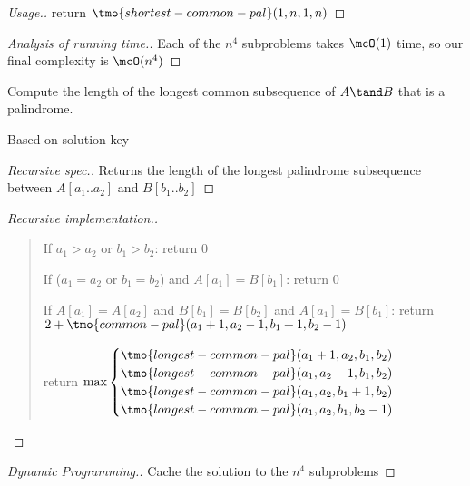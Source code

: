 \documentclass{article}
\begin{document}
\begin{proof}[Usage.]
  return $ \tmo{shortest-common-pal}(1,n,1,n) $
\end{proof}

\begin{proof}[Analysis of running time.]
  Each of the $ n^4 $ subproblems takes $ \mcO(1) $ time, so our final complexity is $ \mcO(n^4) $
\end{proof}
\pagebreak

\begin{subexercise} %
  Compute the length of the longest common subsequence of $A \tand B$ that is a
  palindrome.
\end{subexercise}

\begin{note}
  Based on solution key
\end{note}

\begin{proof}[Recursive spec.]
  Returns the length of the longest palindrome subsequence between $ A[a_1..a_2] $ and $ B[b_1..b_2] $
\end{proof}

\begin{proof}[Recursive implementation.]\
\begin{quote}
\begin{steps}
  \item If $ a_1 > a_2 $ or $ b_1 > b_2 $: return 0
  \item If ($ a_1 = a_2 $ or $ b_1 = b_2 $) and $ A[a_1] = B[b_1] $: return 0
  \item If $ A[a_1] = A[a_2] $ and $ B[b_1] = B[b_2] $ and $ A[a_1] = B[b_1] $: return $ 2+\tmo{common-pal}(a_1+1, a_2-1, b_1+1, b_2-1) $
  \item return $\max\begin{cases}
    \tmo{longest-common-pal}(a_1+1,a_2,b_1,b_2) \\
    \tmo{longest-common-pal}(a_1,a_2-1,b_1,b_2) \\
    \tmo{longest-common-pal}(a_1,a_2,b_1+1,b_2) \\
    \tmo{longest-common-pal}(a_1,a_2,b_1,b_2-1)
  \end{cases}$
\end{steps}
\end{quote}
\end{proof}

\begin{proof}[Dynamic Programming.]
  Cache the solution to the $ n^4 $ subproblems
\end{proof}
\end{document}
